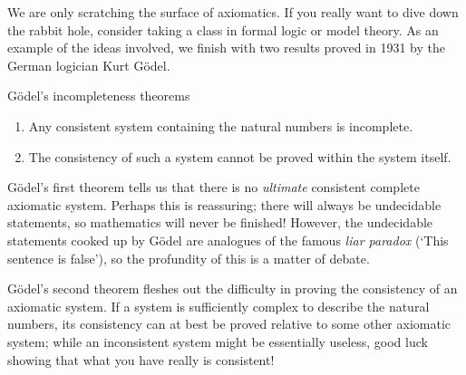 \vfil


We are only scratching the surface of axiomatics. If you really want to dive down the rabbit hole, consider taking a class in formal logic or model theory. As an example of the ideas involved, we finish with two results proved in 1931 by the German logician Kurt Gödel.


\begin{thm}{Gödel's incompleteness theorems}{} 
	\begin{enumerate}
	  \item Any consistent system containing the natural numbers is incomplete.
	  \item The consistency of such a system cannot be proved within the system itself.
	\end{enumerate}
\end{thm}

Gödel's first theorem tells us that there is no \emph{ultimate} consistent complete axiomatic system. Perhaps this is reassuring; there will always be undecidable statements, so mathematics will never be finished! However, the undecidable statements cooked up by Gödel are analogues of the famous \emph{liar paradox} (`This sentence is false'), so the profundity of this is a matter of debate.
\smallbreak

Gödel's second theorem fleshes out the difficulty in proving the consistency of an axiomatic system. If a system is sufficiently complex to describe the natural numbers, its consistency can at best be proved relative to some other axiomatic system; while an inconsistent system might be essentially useless, good luck showing that what you have really is consistent!


\goodbreak


